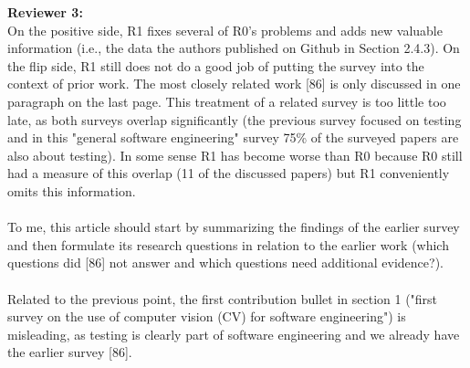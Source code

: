 \documentclass[12pt]{article}
\begin{document}
\newpage
\textbf{Reviewer 3:} \\

On the positive side, R1 fixes several of R0's problems and adds new valuable information (i.e., the data the authors published on Github in Section 2.4.3). On the flip side, R1 still does not do a 
good job of putting the survey into the context of 
prior work. The most closely related work [86] is only 
discussed in one paragraph on the last page. 
This treatment of a related survey is too little too 
late, as both surveys overlap significantly (the 
previous survey focused on testing and in this "general 
software engineering" survey 75\% of the 
surveyed papers are also about testing). In some sense 
R1 has become worse than R0 because R0 still had 
a measure of this overlap (11 of the discussed papers) 
but R1 conveniently omits this information.
\\ \\
To me, this article should start by summarizing the 
findings of the earlier survey and then formulate 
its research questions in relation to the earlier work 
(which questions did [86] not answer and which 
questions need additional evidence?).
\\ \\
Related to the previous point, the first contribution 
bullet in section 1 ("first survey on the use of 
computer vision (CV) for software engineering") is 
misleading, as testing is clearly part of software 
engineering and we already have the earlier survey [86].
\end{document}
